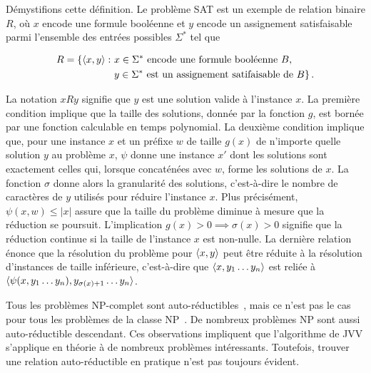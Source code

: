 Démystifions cette définition. Le problème SAT est un exemple de relation binaire $R$, où $x$ encode une formule booléenne et $y$ encode un assignement satisfaisable parmi l'ensemble des entrées possibles $\Sigma^{*}$ tel que

\begin{equation}
    \begin{aligned}
    R = \{ \braket{x, y} : \ & x \in \Sigma^{*} \text{ encode une formule booléenne } B, \\ 
    & y \in \Sigma^{*} \text{ est un assignement satifaisable de } B \} \,.
    \end{aligned}
\end{equation}


La notation $xRy$ signifie que $y$ est une solution valide à l'instance $x$. La première condition implique que la taille des solutions, donnée par la fonction $g$, est bornée par une fonction calculable en temps polynomial. La deuxième condition implique que, pour une instance $x$ et un préfixe $w$ de taille $g(x)$ de n'importe quelle solution $y$ au problème $x$, $\psi$ donne une instance $x'$ dont les solutions sont exactement celles qui, lorsque concaténées avec $w$, forme les solutions de $x$. La fonction $\sigma$ donne alors la granularité des solutions, c'est-à-dire le nombre de caractères de $y$ utilisés pour réduire l'instance $x$. Plus précisément, $\psi(x, w) \leq \lvert x \rvert$ assure que la taille du problème diminue à mesure que la réduction se poursuit. L'implication $g(x) > 0 \implies  \sigma(x) > 0$ signifie que la réduction continue si la taille de l'instance $x$ est non-nulle. La dernière relation énonce que la résolution du problème pour $\braket{x, y}$ peut être réduite à la résolution d'instances de taille inférieure, c'est-à-dire que $\braket{x, y_{1}\dots y_{n}}$ est reliée à $\braket{\psi(x, y_{1}\dots y_{n}), y_{\sigma(x)+1}\dots y_{n}}$.

Tous les problèmes \textsf{NP}-complet sont auto-réductibles~\cite{goldreichComputationalComplexityConceptual2008}, mais ce n'est pas le cas pour tous les problèmes de la classe \textsf{NP}~\cite{khullerPlanarGraphColoring1991a}. De nombreux problèmes \textsf{NP} sont aussi auto-réductible descendant. Ces observations impliquent que l'algorithme de JVV s'applique en théorie à de nombreux problèmes intéressants. Toutefois, trouver une relation auto-réductible en pratique n'est pas toujours évident.

